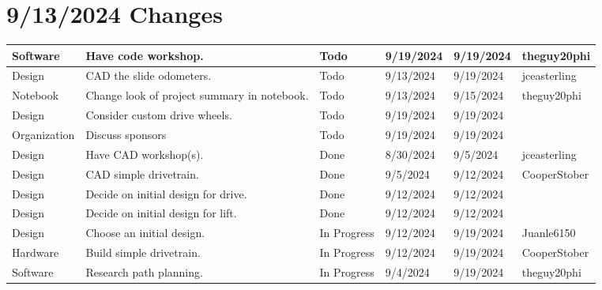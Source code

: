 \section{9/13/2024 Changes}
\begin{center}
\begin{longtable}{| p{40pt} | p{150pt} | p{35pt} | p{33pt} | p{33pt} | p{40pt} |}
\hline \rowcolor{IndianRed1}
Software & Have code workshop. & Todo & 9/19/2024 & 9/19/2024 & theguy20phi \\
\hline \rowcolor{IndianRed1}
Design & CAD the slide odometers. & Todo & 9/13/2024 & 9/19/2024 & jceasterling \\
\hline \rowcolor{IndianRed1}
Notebook & Change look of project summary in notebook. & Todo & 9/13/2024 & 9/15/2024 & theguy20phi \\
\hline \rowcolor{IndianRed1}
Design & Consider custom drive wheels. & Todo & 9/19/2024 & 9/19/2024 & \\
\hline \rowcolor{IndianRed1}
Organization & Discuss sponsors & Todo & 9/19/2024 & 9/19/2024 & \\
\hline \rowcolor{DarkSeaGreen1}
Design & Have CAD workshop(s). & Done & 8/30/2024 & 9/5/2024 & jceasterling \\
\hline \rowcolor{DarkSeaGreen1}
Design & CAD simple drivetrain. & Done & 9/5/2024 & 9/12/2024 & CooperStober \\
\hline \rowcolor{DarkSeaGreen1}
Design & Decide on initial design for drive. & Done & 9/12/2024 & 9/12/2024 & \\
\hline \rowcolor{DarkSeaGreen1}
Design & Decide on initial design for lift. & Done & 9/12/2024 & 9/12/2024 & \\
\hline \rowcolor{LightGoldenrod1}
Design & Choose an initial design. & In Progress & 9/12/2024 & 9/19/2024 & Juanle6150 \\
\hline \rowcolor{LightGoldenrod1}
Hardware & Build simple drivetrain. & In Progress & 9/12/2024 & 9/19/2024 & CooperStober \\
\hline \rowcolor{LightGoldenrod1}
Software & Research path planning. & In Progress & 9/4/2024 & 9/19/2024 & theguy20phi \\
\hline
\end{longtable}
\end{center}


